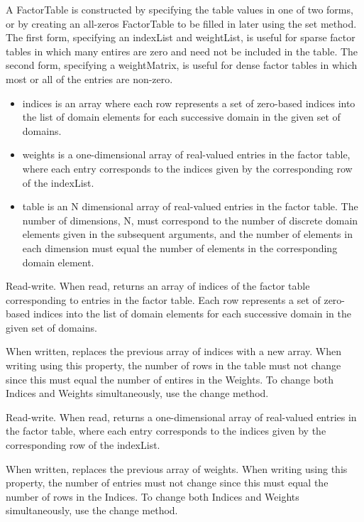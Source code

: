 A FactorTable is constructed by specifying the table values in one of two forms, or by creating an all-zeros FactorTable to be filled in later using the set method.  The first form, specifying an indexList and weightList, is useful for sparse factor tables in which many entires are zero and need not be included in the table.  The second form, specifying a weightMatrix, is useful for dense factor tables in which most or all of the entries are non-zero.

\begin{itemize}
\item indices is an array where each row represents a set of zero-based indices into the list of domain elements for each successive domain in the given set of domains.
\item weights is a one-dimensional array of real-valued entries in the factor table, where each entry corresponds to the indices given by the corresponding row of the indexList.
\item table is an N dimensional array of real-valued entries in the factor table.  The number of dimensions, N, must correspond to the number of discrete domain elements given in the subsequent arguments, and the number of elements in each dimension must equal the number of elements in the corresponding domain element.
\end{itemize}

\fi



Read-write.  When read, returns an array of indices of the factor table corresponding to entries in the factor table.  Each row represents a set of zero-based indices into the list of domain elements for each successive domain in the given set of domains.

When written, replaces the previous array of indices with a new array.  When writing using this property, the number of rows in the table must not change since this must equal the number of entires in the Weights.  To change both Indices and Weights simultaneously, use the change method.


Read-write.  When read, returns a one-dimensional array of real-valued entries in the factor table, where each entry corresponds to the indices given by the corresponding row of the indexList.

When written, replaces the previous array of weights.  When writing using this property, the number of entries must not change since this must equal the number of rows in the Indices.  To change both Indices and Weights simultaneously, use the change method.

